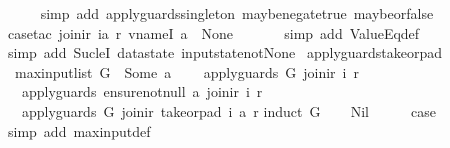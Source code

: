 \begin{isabellebody}
\ \ \ \ \isamarkupfalse%
\ {\isacharparenleft}simp\ add{\isacharcolon}\ apply{\isacharunderscore}guards{\isacharunderscore}singleton\ maybe{\isacharunderscore}negate{\isacharunderscore}true\ maybe{\isacharunderscore}or{\isacharunderscore}false{\isacharparenright}\isanewline
\ \ \ \ \isamarkupfalse%
\ {\isacharparenleft}case{\isacharunderscore}tac\ {\isachardoublequoteopen}join{\isacharunderscore}ir\ ia\ r\ {\isacharparenleft}vname{\isachardot}I\ a{\isacharparenright}\ {\isacharequal}\ None{\isachardoublequoteclose}{\isacharparenright}\isanewline
\ \ \ \ \ \isamarkupfalse%
\ {\isacharparenleft}simp\ add{\isacharcolon}\ ValueEq{\isacharunderscore}def{\isacharparenright}\isanewline
\ \ \ \ \isamarkupfalse%
\ {\isacharparenleft}simp\ add{\isacharcolon}\ Suc{\isacharunderscore}leI\ datastate{\isacharparenleft}{}{\isacharparenright}\ input{}state{\isacharunderscore}not{\isacharunderscore}None{\isacharparenright}\isanewline
{}\isamarkupfalse%
%
\endisatagproof
{\isafoldproof}%
%
\isadelimproof
\isanewline
%
\endisadelimproof
\isanewline
{}\isamarkupfalse%
\ apply{\isacharunderscore}guards{\isacharunderscore}take{\isacharunderscore}or{\isacharunderscore}pad{\isacharcolon}\isanewline
\ \ {\isachardoublequoteopen}max{\isacharunderscore}input{\isacharunderscore}list\ G\ {\isacharless}\ Some\ a\ {\isasymLongrightarrow}\isanewline
\ \ \ apply{\isacharunderscore}guards\ G\ {\isacharparenleft}join{\isacharunderscore}ir\ i\ r{\isacharparenright}\ {\isasymLongrightarrow}\isanewline
\ \ \ apply{\isacharunderscore}guards\ {\isacharparenleft}ensure{\isacharunderscore}not{\isacharunderscore}null\ a{\isacharparenright}\ {\isacharparenleft}join{\isacharunderscore}ir\ i\ r{\isacharparenright}\ {\isasymLongrightarrow}\isanewline
\ \ \ apply{\isacharunderscore}guards\ G\ {\isacharparenleft}join{\isacharunderscore}ir\ {\isacharparenleft}take{\isacharunderscore}or{\isacharunderscore}pad\ i\ a{\isacharparenright}\ r{\isacharparenright}{\isachardoublequoteclose}\isanewline
%
\isadelimproof
%
\endisadelimproof
%
\isatagproof
{}\isamarkupfalse%
{\isacharparenleft}induct\ G{\isacharparenright}\isanewline
\ \ \isamarkupfalse%
\ Nil\isanewline
\ \ \isamarkupfalse%
\ \isamarkupfalse%
\ {\isacharquery}case\isanewline
\ \ \ \ \isamarkupfalse%
\ {\isacharparenleft}simp\ add{\isacharcolon}\ max{\isacharunderscore}input{\isacharunderscore}def{\isacharparenright}\isanewline
{}\isamarkupfalse%

\end{isabellebody}
